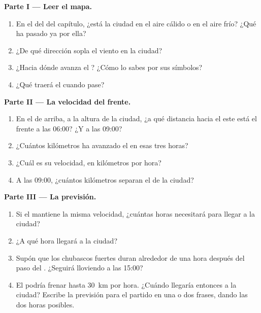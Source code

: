 \begin{problem}
\noindent\textbf{Parte I --- Leer el mapa.}\par\nopagebreak
\begin{enumerate}[beginpenalty=10000]
  \item En el  del  del capítulo, ¿está la ciudad en el aire
        cálido o en el aire frío? ¿Qué  ha pasado ya por ella?
  \item ¿De qué dirección sopla el viento en la ciudad?
  \item ¿Hacia dónde avanza el ? ¿Cómo lo sabes por sus
        símbolos?
  \item ¿Qué  traerá el  cuando pase?
\end{enumerate}

\noindent\textbf{Parte II --- La velocidad del frente.}\par\nopagebreak
\begin{enumerate}[resume, beginpenalty=10000]
  \item En el  de arriba, a la altura de la ciudad, ¿a qué distancia
        hacia el este está el frente a las 06:00? ¿Y a las 09:00?
  \item ¿Cuántos kilómetros ha avanzado el  en esas tres horas?
  \item ¿Cuál es su velocidad, en kilómetros por hora?
  \item A las 09:00, ¿cuántos kilómetros separan el  de la ciudad?
\end{enumerate}

\noindent\textbf{Parte III --- La previsión.}\par\nopagebreak
\begin{enumerate}[resume, beginpenalty=10000]
  \item Si el  mantiene la misma velocidad, ¿cuántas horas necesitará
        para llegar a la ciudad?
  \item ¿A qué hora llegará a la ciudad?
  \item Supón que los chubascos fuertes duran alrededor de una hora después
        del paso del . ¿Seguirá lloviendo a las 15:00?
  \item El  podría frenar hasta \qty{30}{km} por hora. ¿Cuándo
        llegaría entonces a la ciudad? Escribe la previsión para el partido
        en una o dos frases, dando las dos horas posibles.
\end{enumerate}
\end{problem}
